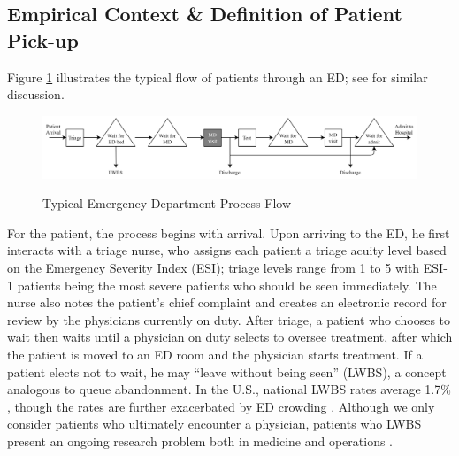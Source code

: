 \begin{table}[htbp]
  \label{tab:sum_stats}%
 \end{table} %

 \subsection{Empirical Context \& Definition of Patient Pick-up} \label{emp_context}
 Figure \ref{fig:ed_flow} illustrates the typical flow of patients through an ED; see \cite{Batt2017} for similar discussion.
 
 \begin{figure}[!b]
     \centering
     \caption{Typical Emergency Department Process Flow } \smallskip
     \includegraphics[scale=.72]{Figures/PU/ED Patient Flow-ED Patient Flow.png}     
     \label{fig:ed_flow}
 \end{figure}  
 
 For the patient, the process begins with arrival. Upon arriving to the ED, he first interacts with a triage nurse, who assigns each patient a triage acuity level based on the Emergency Severity Index (ESI); triage levels range from 1 to 5 with ESI-1 patients being the most severe patients who should be seen immediately. The nurse also notes the patient’s chief complaint and creates an electronic record for review by the physicians currently on duty. After triage, a patient who chooses to wait then waits until a physician on duty selects to oversee treatment, after which the patient is moved to an ED room and the physician starts treatment. If a patient elects not to wait, he may “leave without being seen” (LWBS), a concept analogous to queue abandonment. In the U.S., national LWBS rates average 1.7\% \citep{Pham2009,Moe2016}, though the rates are further exacerbated by ED crowding \citep{Batt2015}. Although we only consider patients who ultimately encounter a physician, patients who LWBS present an ongoing research problem both in medicine and operations \citep{Saghafian2015,Song2018}. 
 
